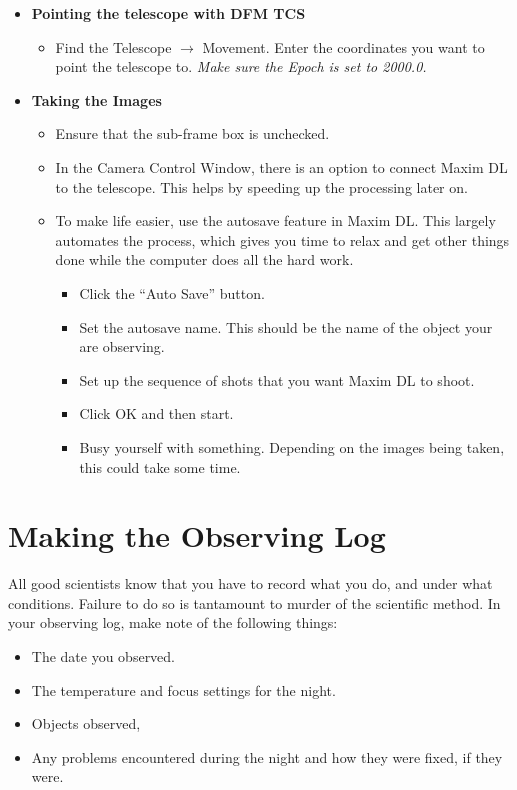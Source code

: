 \documentclass[letterpaper, 12pt]{report}
\begin{document}
\begin{itemize}
	\item {\large \textbf{Pointing the telescope with DFM TCS}}
	\begin{itemize}
		\item Find the Telescope $\rightarrow$ Movement. Enter the coordinates you want to point the telescope to. {\large \emph{Make sure the Epoch is set to 2000.0.}}
	\end{itemize}
	\item {\large \textbf{Taking the Images}}
	\begin{itemize}
		\item Ensure that the sub-frame box is unchecked.
		\item In the Camera Control Window, there is an option to connect Maxim DL to the telescope. This helps by speeding up the processing later on.
		\item To make life easier, use the autosave feature in Maxim DL. This largely automates the process, which gives you time to relax and get other things done while the computer does all the hard work.
		\begin{itemize}
			\item Click the ``Auto Save'' button.
			\item Set the autosave name. This should be the name of the object your are observing.
			\item Set up the sequence of shots that you want Maxim DL to shoot.
			\item Click OK and then start.
			\item Busy yourself with something. Depending on the images being taken, this could take some time.
		\end{itemize}
	\end{itemize}
\end{itemize}

\newpage

\chapter{Making the Observing Log}\label{ch:log}
All good scientists know that you have to record what you do, and under what conditions. Failure to do so is tantamount to murder of the scientific method. In your observing log, make note of the following things:
\begin{itemize}
	\item The date you observed.
	\item The temperature and focus settings for the night.
	\item Objects observed,
	\item Any problems encountered during the night and how they were fixed, if they were.
\end{itemize}
\end{document}
